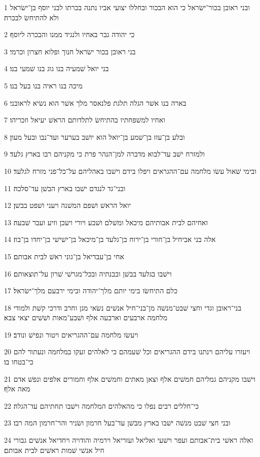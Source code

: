 \par 1 ובני ראובן בכור־ישׂראל כי הוא הבכור ובחללו יצועי אביו נתנה בכרתו לבני יוסף בן־ישׂראל ולא להתיחשׂ לבכרה׃
\par 2 כי יהודה גבר באחיו ולנגיד ממנו והבכרה ליוסף׃
\par 3 בני ראובן בכור ישׂראל חנוך ופלוא חצרון וכרמי׃
\par 4 בני יואל שׁמעיה בנו גוג בנו שׁמעי בנו׃
\par 5 מיכה בנו ראיה בנו בעל בנו׃
\par 6 בארה בנו אשׁר הגלה תלגת פלנאסר מלך אשׁר הוא נשׂיא לראובני׃
\par 7 ואחיו למשׁפחתיו בהתיחשׂ לתלדותם הראשׁ יעיאל וזכריהו׃
\par 8 ובלע בן־עזז בן־שׁמע בן־יואל הוא יושׁב בערער ועד־נבו ובעל מעון׃
\par 9 ולמזרח ישׁב עד־לבוא מדברה למן־הנהר פרת כי מקניהם רבו בארץ גלעד׃
\par 10 ובימי שׁאול עשׂו מלחמה עם־ההגראים ויפלו בידם וישׁבו באהליהם על־כל־פני מזרח לגלעד׃
\par 11 ובני־גד לנגדם ישׁבו בארץ הבשׁן עד־סלכה׃
\par 12 יואל הראשׁ ושׁפם המשׁנה ויעני ושׁפט בבשׁן׃
\par 13 ואחיהם לבית אבותיהם מיכאל ומשׁלם ושׁבע ויורי ויעכן וזיע ועבר שׁבעה׃
\par 14 אלה בני אביחיל בן־חורי בן־ירוח בן־גלעד בן־מיכאל בן־ישׁישׁי בן־יחדו בן־בוז׃
\par 15 אחי בן־עבדיאל בן־גוני ראשׁ לבית אבותם׃
\par 16 וישׁבו בגלעד בבשׁן ובבנתיה ובכל־מגרשׁי שׁרון על־תוצאותם׃
\par 17 כלם התיחשׂו בימי יותם מלך־יהודה ובימי ירבעם מלך־ישׂראל׃
\par 18 בני־ראובן וגדי וחצי שׁבט־מנשׁה מן־בני־חיל אנשׁים נשׂאי מגן וחרב ודרכי קשׁת ולמודי מלחמה ארבעים וארבעה אלף ושׁבע־מאות ושׁשׁים יצאי צבא׃
\par 19 ויעשׂו מלחמה עם־ההגריאים ויטור ונפישׁ ונודב׃
\par 20 ויעזרו עליהם וינתנו בידם ההגריאים וכל שׁעמהם כי לאלהים זעקו במלחמה ונעתור להם כי־בטחו בו׃
\par 21 וישׁבו מקניהם גמליהם חמשׁים אלף וצאן מאתים וחמשׁים אלף וחמורים אלפים ונפשׁ אדם מאה אלף׃
\par 22 כי־חללים רבים נפלו כי מהאלהים המלחמה וישׁבו תחתיהם עד־הגלה׃
\par 23 ובני חצי שׁבט מנשׁה ישׁבו בארץ מבשׁן עד־בעל חרמון ושׂניר והר־חרמון המה רבו׃
\par 24 ואלה ראשׁי בית־אבותם ועפר וישׁעי ואליאל ועזריאל וירמיה והודויה ויחדיאל אנשׁים גבורי חיל אנשׁי שׁמות ראשׁים לבית אבותם׃
